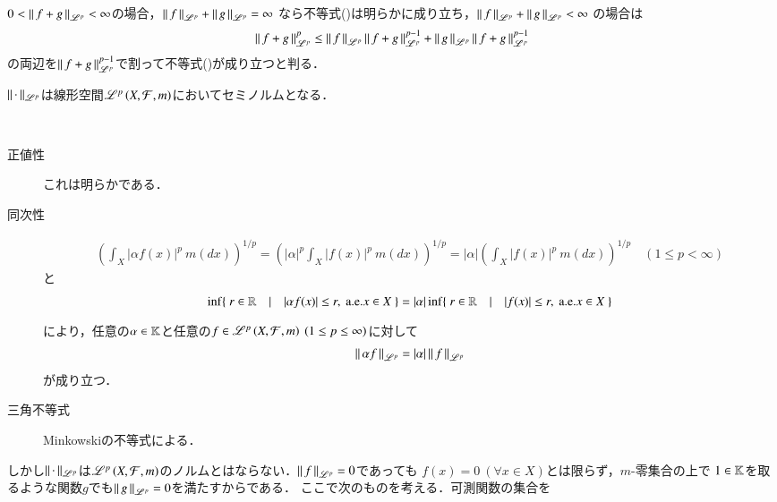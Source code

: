 \begin{qst}
\begin{prf}
\begin{description}
			$0 < \left\|\, f+g\, \right\|_{\mathscr{L}^p} < \infty$の場合，$\left\|\, f\, \right\|_{\mathscr{L}^p} + \left\|\, g\, \right\|_{\mathscr{L}^p} = \infty$
			なら不等式()は明らかに成り立ち，$\left\|\, f\, \right\|_{\mathscr{L}^p} + \left\|\, g\, \right\|_{\mathscr{L}^p} < \infty$
			の場合は
			\begin{align}
				\left\|\, f+g\, \right\|_{\mathscr{L}^p}^p \leq \left\|\, f\, \right\|_{\mathscr{L}^p}\left\|\, f+g\, \right\|_{\mathscr{L}^p}^{p-1} + \left\|\, g\, \right\|_{\mathscr{L}^p}\left\|\, f+g\, \right\|_{\mathscr{L}^p}^{p-1}
			\end{align}
			の両辺を$\left\|\, f+g\, \right\|_{\mathscr{L}^p}^{p-1}$で割って不等式()が成り立つと判る．
			\QED
	\end{description}
\end{prf}

$\left\|\, \cdot\, \right\|_{\mathscr{L}^p}$は線形空間$\mathscr{L}^{p} \left(X,\mathcal{F},m\right)$においてセミノルムとなる．
\begin{bcs}\mbox{}\\
	\begin{description}
	\item[正値性] これは明らかである．
	\item[同次性] 
		\begin{align}
			\left( \int_{X} |\alpha f(x)|^p\ m(dx) \right)^{1/p} = \left( |\alpha|^p \int_{X} |f(x)|^p\ m(dx) \right)^{1/p} 
			= |\alpha| \left( \int_{X} |f(x)|^p\ m(dx) \right)^{1/p} \quad (1 \leq p < \infty)
		\end{align}
		と
		\begin{align}
			\inf{}{\{\ r \in \R\quad |\quad |\alpha f(x)| \leq r,\ \mathrm{a.e.}x \in X\ \}} = |\alpha|\inf{}{\{\ r \in \R\quad |\quad |f(x)| \leq r,\ \mathrm{a.e.}x \in X\ \}}
		\end{align}
		により，任意の$\alpha \in \mathbb{K}$と任意の$f \in \mathscr{L}^{p} \left(X,\mathcal{F},m\right)\ (1 \leq p \leq \infty)$に対して
		\begin{align}
			\left\|\, \alpha f\, \right\|_{\mathscr{L}^p} = |\alpha|\left\|\, f\, \right\|_{\mathscr{L}^p}
		\end{align}
		が成り立つ．
	\item[三角不等式] Minkowskiの不等式による．
	\end{description}
	\QED
\end{bcs}
しかし$\left\|\, \cdot\, \right\|_{\mathscr{L}^p}$は$\mathscr{L}^{p} \left(X,\mathcal{F},m\right)$のノルムとはならない．$\left\|\, f\, \right\|_{\mathscr{L}^p} = 0$であっても
$f(x) = 0 \ (\forall x \in X)$とは限らず，$m$-零集合の上で
$1 \in \mathbb{K}$を取るような関数$g$でも$\left\|\, g\, \right\|_{\mathscr{L}^p} = 0$を満たすからである．
ここで次のものを考える．可測関数の集合を
\begin{align}

\end{align}
\end{qst}
